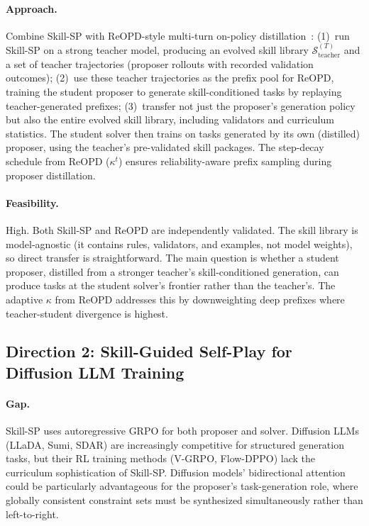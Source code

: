 \documentclass[11pt,a4paper]{article}
\begin{document}
\paragraph{Approach.}
Combine Skill-SP with ReOPD-style multi-turn on-policy distillation~\cite{liao2026multiturn}: (1)~run Skill-SP on a strong teacher model, producing an evolved skill library $\mathcal{S}^{(T)}_{\text{teacher}}$ and a set of teacher trajectories (proposer rollouts with recorded validation outcomes); (2)~use these teacher trajectories as the prefix pool for ReOPD, training the student proposer to generate skill-conditioned tasks by replaying teacher-generated prefixes; (3)~transfer not just the proposer's generation policy but also the entire evolved skill library, including validators and curriculum statistics. The student solver then trains on tasks generated by its own (distilled) proposer, using the teacher's pre-validated skill packages. The step-decay schedule from ReOPD ($\kappa^t$) ensures reliability-aware prefix sampling during proposer distillation.

\paragraph{Feasibility.}
High. Both Skill-SP and ReOPD are independently validated. The skill library is model-agnostic (it contains rules, validators, and examples, not model weights), so direct transfer is straightforward. The main question is whether a student proposer, distilled from a stronger teacher's skill-conditioned generation, can produce tasks at the student solver's frontier rather than the teacher's. The adaptive $\kappa$ from ReOPD addresses this by downweighting deep prefixes where teacher-student divergence is highest.

\subsection{Direction 2: Skill-Guided Self-Play for Diffusion LLM Training}

\paragraph{Gap.}
Skill-SP uses autoregressive GRPO for both proposer and solver. Diffusion LLMs (LLaDA, Sumi, SDAR) are increasingly competitive for structured generation tasks, but their RL training methods (V-GRPO, Flow-DPPO) lack the curriculum sophistication of Skill-SP. Diffusion models' bidirectional attention could be particularly advantageous for the proposer's task-generation role, where globally consistent constraint sets must be synthesized simultaneously rather than left-to-right.
\end{document}
